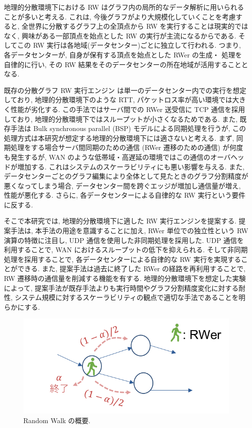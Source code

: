 地理的分散環境下における RW はグラフ内の局所的なデータ解析に用いられることが多いと考える. これは, 今後グラフがより大規模化していくことを考慮すると, 全世界に分散するグラフ上の全頂点から RW を実行することは現実的ではなく, 興味がある一部頂点を始点とした RW の実行が主流になるからである. そしてこの RW 実行は各地域(データセンター)ごとに独立して行われる. つまり, 各データセンターが, 自身が保有する頂点を始点とした RWer の生成・ 処理を自律的に行い, その RW 結果をそのデータセンターの所在地域が活用することとなる. 

既存の分散グラフ RW 実行エンジン \cite{10.1145/3341301.3359634} は単一のデータセンター内での実行を想定しており, 地理的分散環境下のような RTT, パケットロス率が高い環境では大きく性能が劣化する. この手法ではサーバ間での RWer 送受信に TCP 通信を採用しており, 地理的分散環境下ではスループットが小さくなるためである. また, 既存手法は Bulk synchronous parallel (BSP) モデルによる同期処理を行うが, この処理方式は本研究が想定する地理的分散環境下には適さないと考える. まず, 同期処理をする場合サーバ間同期のための通信 (RWer 遷移のための通信) が何度も発生するが, WAN のような低帯域・高遅延の環境ではこの通信のオーバヘッドが増加する. これはシステムのスケーラビリティにも悪い影響を与える. また, データセンターごとのグラフ編集により全体として見たときのグラフ分割精度が悪くなってしまう場合, データセンター間を跨ぐエッジが増加し通信量が増え, 性能が悪化する. さらに, 各データセンターによる自律的な RW 実行という要件に反する. 

そこで本研究では, 地理的分散環境下に適した RW 実行エンジンを提案する. 提案手法は, 本手法の用途を意識することに加え, RWer 単位での独立性という RW 演算の特徴に注目し, UDP 通信を使用した非同期処理を採用した. UDP 通信を利用することで, WAN におけるスループットの低下を抑えられる. そして非同期処理を採用することで, 各データセンターによる自律的な RW 実行を実現することができる. また, 提案手法は過去に終了した RWer の経路を再利用することで, RW 遷移時の通信量を削減する機能を有する. 地理的分散環境下を想定した実験によって, 提案手法が既存手法よりも実行時間やグラフ分割精度変化に対する耐性, システム規模に対するスケーラビリティの観点で適切な手法であることを明らかにする. 

\begin{figure}[t]
    \centering
    \includegraphics[scale=1.0]{figure/RandomWalk.pdf}
    \caption{Random Walk の概要.}
    \label{Random Walk の概要}
\end{figure}

